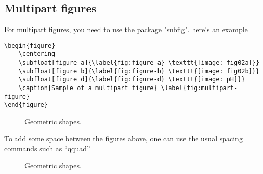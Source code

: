 \subsection{Multipart figures}
For multipart figures, you need to use the package "subfig". here's an example
\begin{verbatim}
\begin{figure}
    \centering
    \subfloat[figure a]{\label{fig:figure-a} \texttt{[image: fig02a]}}
    \subfloat[figure b]{\label{fig:figure-b} \texttt{[image: fig02b]}}
	\subfloat[figure d]{\label{fig:figure-d} \texttt{[image: pH]}}
    \caption{Sample of a multipart figure} \label{fig:multipart-figure}
\end{figure}
\end{verbatim}
\begin{figure}[h!]
        \centering
        \subfloat[Cube]{\label{fig:figure-c}\texttt{[image: pH]}}
        \caption{Geometric shapes.}
        \label{fig:multipart-figure}
\end{figure}
To add some space between the figures above, one can use the usual spacing commands such as ``qquad''
\begin{figure}[h!]
        \centering
         \qquad
        \qquad
        \qquad
        \caption{Geometric shapes.}
        \label{fig:multipart-figure}
\end{figure} 